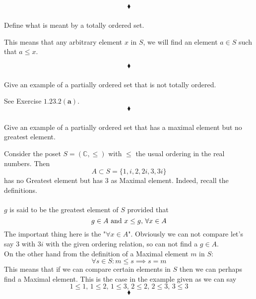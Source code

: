 $$\blacklozenge$$

\subsubsection{}
\begin{tcolorbox}
Define what is meant by a totally ordered set.
\end{tcolorbox}
This means that any arbitrary element $x$ in $S$, we will find an element $a\in S$ such that $a\leq x$. 

$$\blacklozenge$$

\subsubsection{}
\begin{tcolorbox}
Give an example of a partially ordered set that is not totally ordered.  
\end{tcolorbox}

See Exercise $\mathbf{1.23.2(a)}$.
$$\blacklozenge$$

\subsubsection{}
\begin{tcolorbox}
Give an example of a partially ordered set that has a maximal element but no greatest element. 
\end{tcolorbox}
Consider the poset $S=(\mathbb{C},\leq)$ with $\leq$ the usual ordering in the real numbers. Then
$$A\subset S=\{1,i, 2,2i, 3,3i\}$$
has no Greatest element but has $3$ as Maximal element.
Indeed, recall the definitions.\\\\
$g$ is said to be the greatest element of $S$ provided that 
$$g\in A\text{ and } x\leq g,\, \forall x\in A$$
The important thing here is the "$\forall x\in A$". Obviously we can not compare let's say $3$ with $3i$ with the given ordering relation, so can not find a $g\in A$.\\ 
On the other hand from the definition of a Maximal element $m$ in $S$:
$$\forall s\in S: m\leq s\implies s=m$$
This means that if we  can compare certain elements in $S$ then we can perhaps find a Maximal element. This is the case in the example given as we can say $$1\leq 1,\,1\leq 2,\,1\leq 3,\,2\leq 2,\,2\leq 3,\,3\leq 3$$ 
$$\blacklozenge$$

